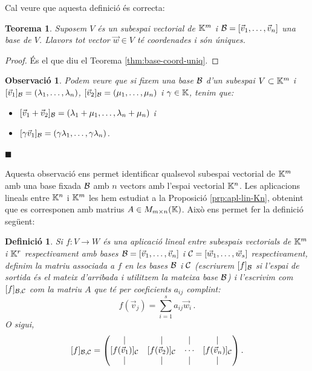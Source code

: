 \documentclass[
  11pt,
]{book}
\numberwithin{dummy}{section}
\theoremstyle{maincolornumbox}
\newtheorem{theorem}{TTTT}[chapter]
\newtheorem{theoremeT}{Teorema}[chapter]
\newtheorem{remarkT}{Observació}[chapter]
\theoremstyle{blacknumex}
\theoremstyle{blacknumbox}
\newtheorem{definitionT}{Definició}[chapter]
\theoremstyle{maincolornum}
\renewenvironment{theorem}{\begin{tBox}\begin{theoremeT}}{\end{theoremeT}\end{tBox}}
\newenvironment{definition}{\begin{dBox}\begin{definitionT}}{\end{definitionT}\end{dBox}}
\newenvironment{remark}{\begin{remarkT}}{\hfill{\tiny\ensuremath{\blacksquare}}\end{remarkT}}
\newlength\esp
\begin{document}
Cal veure que aquesta definició és correcta:

\begin{theorem}
Suposem \(V\) és un subespai vectorial de \(\mathbb{K}^m\) i
\(\mathcal{B} =[\vec v_1, \dots, \vec v_n]\) una base de \(V\). Llavors tot vector
\(\vec w\in V\) té coordenades i són úniques.
\end{theorem}

\begin{proof}
És el que diu el Teorema
\ref{thm:base-coord-uniq}.
\end{proof}

\begin{remark}

Podem veure que si fixem una base \(\mathcal{B}\) d'un subespai \(V\subset \mathbb{K}^m\)
i \([\vec v_1]_{\mathcal{B}}=(\lambda_1,\dots,\lambda_n)\),
\([\vec v_2]_{\mathcal{B}}=(\mu_1,\dots,\mu_n)\) i \(\gamma \in \mathbb{K}\), tenim que:

\begin{itemize}
\item
  \([\vec v_1+\vec v_2]_{\mathcal{B}}=(\lambda_1+\mu_1,\dots,\lambda_n+\mu_n)\)
  i
\item
  \([\gamma \vec v_1]_{\mathcal{B}}=(\gamma \lambda_1, \dots, \gamma \lambda_n)\).
\end{itemize}

\end{remark}

Aquesta observació ens permet identificar qualsevol subespai vectorial
de \(\mathbb{K}^m\) amb una base fixada \(\mathcal{B}\) amb \(n\) vectors amb l'espai
vectorial \(\mathbb{K}^n\). Les aplicacions lineals entre \(\mathbb{K}^n\) i \(\mathbb{K}^m\) les hem
estudiat a la Proposició
\ref{prp:apl-lin-Kn}, obtenint que es corresponen amb matrius
\(A \in M_{m\times n}(\mathbb{K})\). Això ens permet fer la definició següent:

\begin{definition}
\protect\hypertarget{def:matriu-apl-lineal}{}\label{def:matriu-apl-lineal}Si
\(f\colon V \to W\) és una aplicació lineal entre subespais vectorials de
\(\mathbb{K}^m\) i \(\mathbb{K}^r\) respectivament amb bases
\(\mathcal{B}=[\vec v_1, \dots, \vec v_n]\) i
\(\mathcal{C}=[\vec w_1, \dots, \vec w_s]\) respectivament, definim la \emph{matriu
associada a \(f\) en les bases \(\mathcal{B}\) i \(\mathcal{C}\)} (escriurem \([f]_{\mathcal{B}}\)
si l'espai de sortida és el mateix d'arribada i utilitzem la mateixa
base \(\mathcal{B}\)) i l'escrivim com \([f]_{\mathcal{B},\mathcal{C}}\) com la matriu \(A\) que
té per coeficients \(a_{ij}\) complint:
\[f(\vec v_j)=\sum_{i=1}^s a_{ij} \vec w_i \,.\] O sigui,
\[[f]_{\mathcal{B},\mathcal{C}}=\begin{pmatrix}
    \mid & \mid &\mid & \mid\\
    [f(\vec v_1)]_{\mathcal{C}} & [f(\vec v_2)]_{\mathcal{C}} &\cdots&[f(\vec v_n)]_{\mathcal{C}}\\
    \mid & \mid &\mid & \mid
    \end{pmatrix}.\]
\end{definition}
\end{document}
